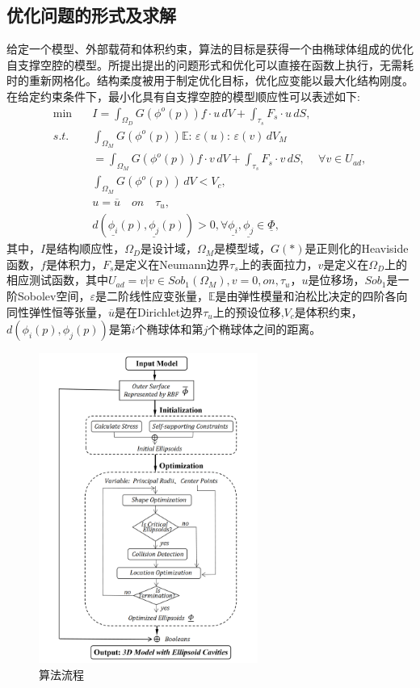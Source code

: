 \subsection{优化问题的形式及求解}
给定一个模型、外部载荷和体积约束，算法的目标是获得一个由椭球体组成的优化自支撑空腔的模型。所提出提出的问题形式和优化可以直接在函数上执行，无需耗时的重新网格化。结构柔度被用于制定优化目标，优化应变能以最大化结构刚度。在给定约束条件下，最小化具有自支撑空腔的模型顺应性可以表述如下:
\begin{equation}
  \begin{split}
      \min \quad  &I = \int_{\Omega_{D}} G(\phi^o(p))f \cdot u \, dV + \int_{\tau_{s}}F_{s} \cdot u\, dS ,     \\
      s.t.\quad  &\int_{\Omega_{M}} G(\phi^o(p)) \mathbb{E}:\, \varepsilon(u):\, \varepsilon(v)\, dV_{M}\\
      &= \int_{\Omega_{M}} G(\phi^o(p))f \cdot v \, dV  + \int_{\tau_{s}}F_{s} \cdot v\, dS,\,  \quad\forall v\in U_{ad},         \\
      & \int_{\Omega_{M}} G(\phi^o(p))\, dV< V_{c},                       \\
      & u = \overline{u} \quad on\quad \tau_{u},                       \\
      & d(\underline{\phi_{i}}(p), \underline{\phi_{j}}(p))>0,\forall \underline{\phi_{i}},\underline{\phi_{j}}\in\underline{\Phi},  \label{eq:7}
  \end{split}
\end{equation}
其中，$I$是结构顺应性，$\Omega_{D}$是设计域，$\Omega_{M}$是模型域，$G(*)$是正则化的Heaviside函数\cite{hu2020efficient}，$f$是体积力，$F_{s}$是定义在Neumann边界$\tau_{s}$上的表面拉力，$v$是定义在$\Omega_{D}$上的相应测试函数，其中$U_{ad} = {v|v\in Sob_{1}(\Omega_{M}), v = 0 , on ,\tau_{u}}$，$u$是位移场，$Sob_{1}$是一阶Sobolev空间，$\varepsilon$是二阶线性应变张量，$\mathbb{E}$是由弹性模量和泊松比决定的四阶各向同性弹性恒等张量，$\overline{u}$是在Dirichlet边界$\tau_{u}$上的预设位移,$V_{c}$是体积约束，$d(\phi_{i}(p), \phi_{j}(p))$是第$i$个椭球体和第$j$个椭球体之间的距离。
\begin{figure}[t]
  \centering
  \includegraphics[height=4in]{./figures/self-support/fig17.png}
  \caption{算法流程}
  \label{fig:algo}
\end{figure}

